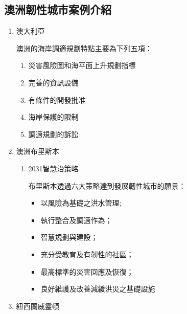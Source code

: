 \documentclass[a4paper,12pt]{article}
\begin{document}
\subsection{澳洲韌性城市案例介紹}
\label{sec:orgf63ae0c}

\begin{enumerate}
\item 澳大利亞
\label{sec:orgac60a45}

澳洲的海岸調適規劃特點主要為下列五項：\\
\begin{enumerate}
\item 災害風險圖和海平面上升規劃指標\\
\item 完善的資訊設備\\
\item 有條件的開發批准\\
\item 海岸保護的限制\\
\item 調適規劃的訴訟\\
\end{enumerate}

\item 澳洲布里斯本
\label{sec:org952e37f}

\begin{enumerate}
\item 2031智慧治策略
\label{sec:org47df587}

布里斯本透過六大策略達到發展韌性城市的願景：\\
\begin{itemize}
\item 以風險為基礎之洪水管理;\\
\item 執行整合及調適作為；\\
\item 智慧規劃與建設；\\
\item 充分受教育及有韌性的社區；\\
\item 最高標準的災害回應及恢復；\\
\item 良好維護及改善減緩洪災之基礎設施\\
\end{itemize}
\end{enumerate}

\item 紐西蘭威靈頓
\label{sec:org7645115}


\end{enumerate}
\end{document}
